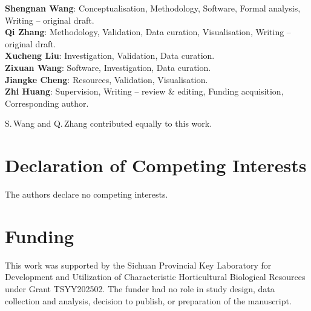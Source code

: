 \documentclass[fleqn,10pt]{wlscirep}
\begin{document}
\textbf{Shengnan Wang}: Conceptualisation, Methodology, Software, Formal
analysis, Writing -- original draft. \\
\textbf{Qi Zhang}: Methodology, Validation, Data curation, Visualisation,
Writing -- original draft. \\
\textbf{Xucheng Liu}: Investigation, Validation, Data curation. \\
\textbf{Zixuan Wang}: Software, Investigation, Data curation. \\
\textbf{Jiangke Cheng}: Resources, Validation, Visualisation. \\
\textbf{Zhi Huang}: Supervision, Writing -- review \& editing, Funding
acquisition, Corresponding author.

\vspace{0.5em}
\noindent S.\,Wang and Q.\,Zhang contributed equally to this work.

\section*{Declaration of Competing Interests}

The authors declare no competing interests.

\section*{Funding}

This work was supported by the Sichuan Provincial Key Laboratory for Development and Utilization of Characteristic Horticultural Biological Resources under Grant TSYY202502. The funder had no role in study design, data collection and analysis, decision to publish, or preparation of the manuscript.


\end{document}
